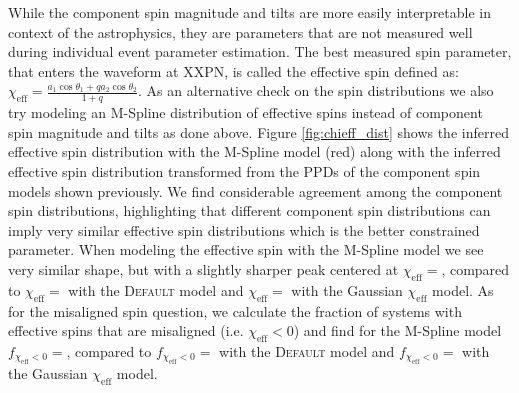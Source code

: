 While the component spin magnitude and tilts are more easily interpretable in context of the astrophysics, they are parameters that 
are not measured well during individual event parameter estimation. The best measured spin parameter, that enters the waveform at XXPN, is 
called the effective spin defined as: $\chi_\mathrm{eff} = \frac{a_1\cos{\theta_1} + qa_2\cos{\theta_2}}{1+q}$. As an alternative check 
on the spin distributions we also try modeling an M-Spline distribution of effective spins instead of component spin magnitude and tilts 
as done above. Figure \ref{fig:chieff_dist} shows the inferred effective spin distribution with the M-Spline model (red) along with the 
inferred effective spin distribution transformed from the PPDs of the component spin models shown previously. We find considerable agreement 
among the component spin distributions, highlighting that different component spin distributions can imply very similar effective spin 
distributions which is the better constrained parameter. When modeling the effective spin with the M-Spline model we see very similar 
shape, but with a slightly sharper peak centered at $\chi_\mathrm{eff}=$\result{$\CIPlusMinus{\macros[ChiEffective][chieff][PeakChiEff]}$}, compared to 
$\chi_\mathrm{eff}=$\result{$\CIPlusMinus{\macros[ChiEffective][default][PeakChiEff]}$} with the \textsc{Default} model and 
$\chi_\mathrm{eff}=$\result{$\CIPlusMinus{\macros[ChiEffective][gaussian][PeakChiEff]}$} with the Gaussian $\chi_\mathrm{eff}$ model. 
As for the misaligned spin question, we calculate the fraction of systems with effective spins that are misaligned (i.e. $\chi_\mathrm{eff}<0$) and 
find for the M-Spline model $f_{\chi_\mathrm{eff}<0}=$\result{$\CIPlusMinus{\macros[ChiEffective][chieff][FracBelow0]}$}, compared to 
$f_{\chi_\mathrm{eff}<0}=$\result{$\CIPlusMinus{\macros[ChiEffective][default][FracBelow0]}$} with the \textsc{Default} model and 
$f_{\chi_\mathrm{eff}<0}=$\result{$\CIPlusMinus{\macros[ChiEffective][gaussian][FracBelow0]}$} with the Gaussian $\chi_\mathrm{eff}$ model.
